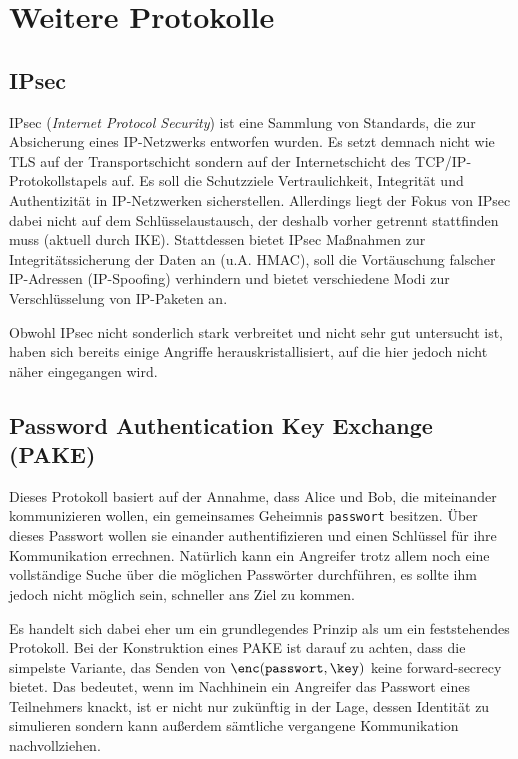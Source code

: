 \section{Weitere Protokolle}

\subsection{IPsec}\indexIPsec
IPsec (\emph{Internet Protocol Security}) ist eine Sammlung von
Standards, die zur Absicherung eines IP-Netzwerks entworfen wurden. Es
setzt demnach nicht wie TLS auf der Transportschicht sondern auf der
Internetschicht des TCP/IP-Protokollstapels auf. Es soll die Schutzziele
Vertraulichkeit, Integrität und Authentizität in IP-Netzwerken
sicherstellen. Allerdings liegt der Fokus von IPsec dabei nicht auf dem
Schlüsselaustausch, der deshalb vorher getrennt stattfinden muss
(aktuell durch IKE). Stattdessen bietet IPsec Maßnahmen zur
Integritätssicherung der Daten an (u.A. HMAC), soll die Vortäuschung
falscher IP-Adressen (IP-Spoofing) verhindern und bietet verschiedene
Modi zur Verschlüsselung von IP-Paketen an.

Obwohl IPsec nicht sonderlich stark verbreitet und nicht sehr gut
untersucht ist, haben sich bereits einige Angriffe herauskristallisiert,
auf die hier jedoch nicht näher eingegangen wird.


\subsection{Password Authentication Key Exchange (PAKE)}\indexPAKE
Dieses Protokoll basiert auf der Annahme, dass Alice und Bob, die
miteinander kommunizieren wollen, ein gemeinsames Geheimnis
\texttt{passwort} besitzen. Über dieses Passwort wollen sie einander
authentifizieren und einen Schlüssel für ihre Kommunikation
errechnen. Natürlich kann ein Angreifer trotz allem noch eine
vollständige Suche über die möglichen Passwörter durchführen, es sollte
ihm jedoch nicht möglich sein, schneller ans Ziel zu kommen.

Es handelt sich dabei eher um ein grundlegendes Prinzip als um ein
feststehendes Protokoll. Bei der Konstruktion eines PAKE ist darauf zu
achten, dass die simpelste Variante, das Senden von
$\enc(\mathtt{passwort}, \key)$ keine forward-secrecy bietet. Das
bedeutet, wenn im Nachhinein ein Angreifer das Passwort eines
Teilnehmers knackt, ist er nicht nur zukünftig in der Lage, dessen
Identität zu simulieren sondern kann außerdem sämtliche vergangene
Kommunikation nachvollziehen.

